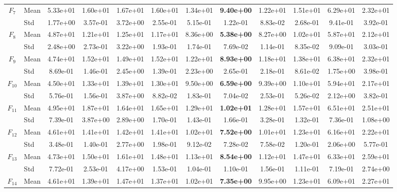 \begin{center}
\begin{longtable}{clcccccccccc}
\midrule
$F_{7}$ & Mean & 5.33e+01 & 1.60e+01 & 1.67e+01 & 1.60e+01 & 1.34e+01 & \textbf{9.40e+00} & 1.22e+01 & 1.51e+01 & 6.29e+01 & 2.32e+01 \\
 & Std & 1.77e+00 & 3.57e-01 & 3.72e+00 & 2.55e-01 & 5.15e-01 & 1.22e-01 & 8.83e-02 & 2.68e-01 & 9.41e-01 & 3.92e-01 \\
\midrule
$F_{8}$ & Mean & 4.87e+01 & 1.21e+01 & 1.25e+01 & 1.17e+01 & 8.36e+00 & \textbf{5.38e+00} & 8.27e+00 & 1.02e+01 & 5.87e+01 & 2.12e+01 \\
 & Std & 2.48e+00 & 2.73e-01 & 3.22e+00 & 1.93e-01 & 1.74e-01 & 7.69e-02 & 1.14e-01 & 8.35e-02 & 9.09e-01 & 3.03e-01 \\
\midrule
$F_{9}$ & Mean & 4.74e+01 & 1.52e+01 & 1.49e+01 & 1.52e+01 & 1.22e+01 & \textbf{8.93e+00} & 1.18e+01 & 1.38e+01 & 6.38e+01 & 2.32e+01 \\
 & Std & 8.69e-01 & 1.46e-01 & 2.45e+00 & 1.39e-01 & 2.23e+00 & 2.65e-01 & 2.18e-01 & 8.61e-02 & 1.75e+00 & 3.98e-01 \\
\midrule
$F_{10}$ & Mean & 4.50e+01 & 1.33e+01 & 1.39e+01 & 1.30e+01 & 9.50e+00 & \textbf{6.59e+00} & 9.39e+00 & 1.10e+01 & 5.94e+01 & 2.17e+01 \\
 & Std & 5.76e-01 & 1.56e-01 & 3.87e+00 & 8.82e-02 & 1.83e-01 & 7.04e-02 & 2.53e-01 & 5.26e-02 & 2.12e+00 & 3.82e-01 \\
\midrule
$F_{11}$ & Mean & 4.95e+01 & 1.87e+01 & 1.64e+01 & 1.65e+01 & 1.29e+01 & \textbf{1.02e+01} & 1.28e+01 & 1.57e+01 & 6.51e+01 & 2.51e+01 \\
 & Std & 7.39e-01 & 3.87e+00 & 2.89e+00 & 1.70e-01 & 1.43e-01 & 1.66e-01 & 3.28e-01 & 1.32e-01 & 7.36e-01 & 1.08e+00 \\
\midrule
$F_{12}$ & Mean & 4.61e+01 & 1.41e+01 & 1.42e+01 & 1.41e+01 & 1.02e+01 & \textbf{7.52e+00} & 1.01e+01 & 1.23e+01 & 6.16e+01 & 2.22e+01 \\
 & Std & 3.48e-01 & 1.40e-01 & 2.77e+00 & 1.98e-01 & 9.12e-02 & 7.28e-02 & 7.58e-02 & 1.20e-01 & 2.06e+00 & 5.77e-01 \\
\midrule
$F_{13}$ & Mean & 4.73e+01 & 1.50e+01 & 1.61e+01 & 1.48e+01 & 1.13e+01 & \textbf{8.54e+00} & 1.12e+01 & 1.47e+01 & 6.33e+01 & 2.59e+01 \\
 & Std & 7.72e-01 & 2.53e-01 & 4.17e+00 & 1.53e-01 & 1.04e-01 & 1.10e-01 & 1.56e-01 & 1.11e-01 & 7.19e-01 & 2.74e+00 \\
\midrule
$F_{14}$ & Mean & 4.61e+01 & 1.39e+01 & 1.47e+01 & 1.37e+01 & 1.02e+01 & \textbf{7.35e+00} & 9.95e+00 & 1.23e+01 & 6.09e+01 & 2.27e+01 \\

\end{longtable}
\end{center}
